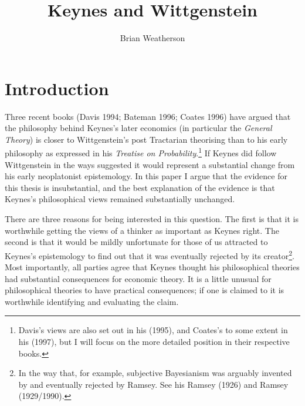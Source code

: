 \documentclass[noflushend]{philosophersimprint}
\begin{document}
\title{Keynes and Wittgenstein}

\author{Brian Weatherson}

% 
% 
% 
% 

\maketitle  

\hypertarget{introduction}{%
\section{Introduction}\label{introduction}}

Three recent books (Davis 1994; Bateman 1996; Coates 1996) have argued
that the philosophy behind Keynes's later economics (in particular the
\emph{General Theory}) is closer to Wittgenstein's post Tractarian
theorising than to his early philosophy as expressed in his
\emph{Treatise on Probability}.\footnote{Davis's views are also set out
  in his (1995), and Coates's to some extent in his (1997), but I will
  focus on the more detailed position in their respective books.} If
Keynes did follow Wittgenstein in the ways suggested it would represent
a substantial change from his early neoplatonist epistemology. In this
paper I argue that the evidence for this thesis is insubstantial, and
the best explanation of the evidence is that Keynes's philosophical
views remained substantially unchanged.

There are three reasons for being interested in this question. The first
is that it is worthwhile getting the views of a thinker as important as
Keynes right. The second is that it would be mildly unfortunate for
those of us attracted to Keynes's epistemology to find out that it was
eventually rejected by its creator\footnote{In the way that, for
  example, subjective Bayesianism was arguably invented by and
  eventually rejected by Ramsey. See his Ramsey (1926) and Ramsey
  (1929/1990).}. Most importantly, all parties agree that Keynes thought
his philosophical theories had substantial consequences for economic
theory. It is a little unusual for philosophical theories to have
practical consequences; if one is claimed to it is worthwhile
identifying and evaluating the claim.
\end{document}
